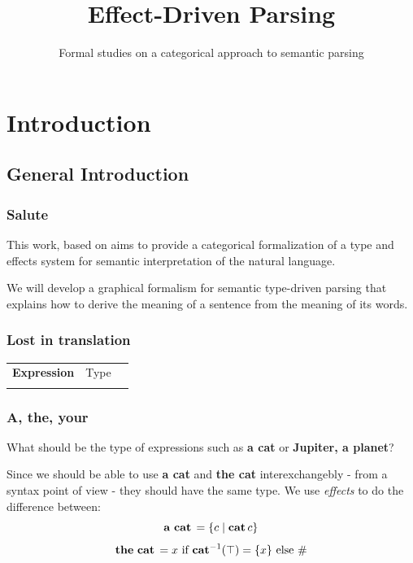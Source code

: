 \documentclass[math, english, info]{beamercours}
\title{Effect-Driven Parsing}
\subtitle{Formal studies on a categorical approach to semantic parsing}
\institute{École Normale Supérieure | Yale University}
\begin{document}
\fancytitleframe

\section{Introduction}
\subsection{General Introduction}
\begin{frame}
	\frametitle{Salute}
	This work, based on \cite{bumfordEffectdrivenInterpretationFunctors2025} aims
	to provide a categorical formalization of a type and effects system for
	semantic interpretation of the natural language.

	\medskip

	We will develop a graphical formalism for semantic type-driven parsing that
	explains how to derive the meaning of a sentence from the meaning of its
	words.
\end{frame}

\begin{frame}[fragile]
	\frametitle{Lost in translation}
	\setcellgapes{3pt}
	\makegapedcells
	\begin{NiceTabular}{>{\bf}LLL}
		Expression & \rm Type & \lambda{} \\
		\CodeAfter
	\end{NiceTabular}
\end{frame}

\begin{frame}[fragile]
	\frametitle{A, the, your}
	What should be the type of expressions such as \textbf{a cat} or \textbf{Jupiter, a planet}?
	\pause

	\smallskip

	Since we should be able to use \textbf{a cat} and \textbf{the cat} interexchangebly - from a syntax point of view - they should have the same type.
	We use \emph{effects} to do the difference between:
	\begin{equation*}
		\mathbf{a\ cat}\, = \{c \mid \mathbf{cat}\, c\}
	\end{equation*}
	\begin{equation*}
		\mathbf{the\ cat}\, = x \text{ if } \mathbf{cat}^{-1}(\top) = \{x\} \text{ else } \#
	\end{equation*}
\end{frame}
\end{document}
